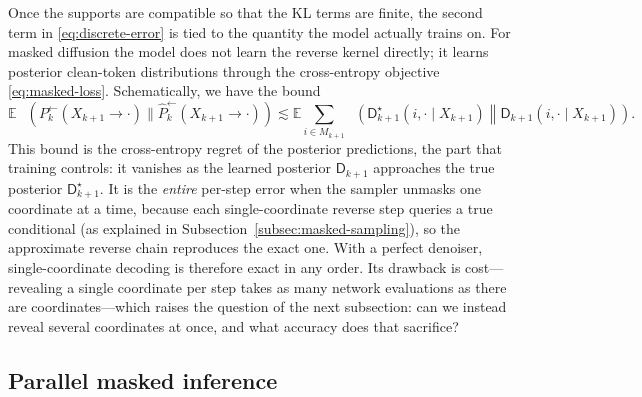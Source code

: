 \documentclass{amsart}
\numberwithin{equation}{section}
\theoremstyle{plain}
\theoremstyle{definition}
\theoremstyle{remark}
\DeclareMathOperator{\KL}{D_{\mathsf{KL}}}
\newcommand{\E}{\mathbb{E}}
\newcommand{\wh}[1]{\widehat{#1}}
\newcommand{\dstar}{\mathsf{D}^{\star}}
\newcommand{\denoiser}{\mathsf{D}}
\begin{document}
Once the supports are compatible so that the KL terms are finite, the second term in
\eqref{eq:discrete-error} is tied to the quantity the model actually trains on.
For masked diffusion the model does not learn the reverse kernel directly; it
learns posterior clean-token distributions through the cross-entropy objective
\eqref{eq:masked-loss}.  Schematically, we have the bound
\[
    \E\,\KL(P_k^{\leftarrow}(X_{k+1} \to \cdot)\|\wh P_k^{\leftarrow}(X_{k+1} \to \cdot))
    \lesssim
    \E\sum_{i\in M_{k+1}}
    \KL\!\left(
    \dstar_{k+1}(i,\cdot\mid X_{k+1})
    \middle\|
    \denoiser_{k+1}(i,\cdot\mid X_{k+1})
    \right).
\]
This bound is the cross-entropy regret of the posterior predictions, the part
that training controls: it vanishes as the learned posterior
$\denoiser_{k+1}$ approaches the true posterior $\dstar_{k+1}$.  It is the
\emph{entire} per-step error when the sampler unmasks one coordinate at a time,
because each single-coordinate reverse step queries a true conditional (as
explained in Subsection~\ref{subsec:masked-sampling}), so the approximate reverse
chain reproduces the exact one.  With a perfect denoiser, single-coordinate
decoding is therefore exact in any order.  Its drawback is cost---revealing a
single coordinate per step takes as many network evaluations as there are
coordinates---which raises the question of the next subsection: can we instead
reveal several coordinates at once, and what accuracy does that sacrifice?

\subsection{Parallel masked inference}
\label{subsec:parallel-inference}
\end{document}

